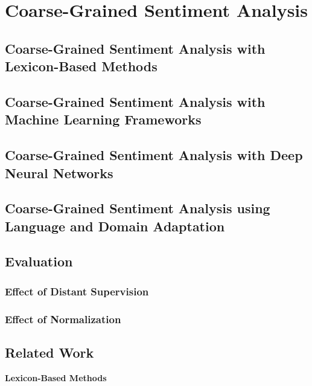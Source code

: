 \chapter{Coarse-Grained Sentiment Analysis}\label{sec:snt:cgsa}

\section{Coarse-Grained Sentiment Analysis with Lexicon-Based Methods}

\section{Coarse-Grained Sentiment Analysis with Machine Learning
  Frameworks}

\section{Coarse-Grained Sentiment Analysis with Deep Neural Networks}

\section{Coarse-Grained Sentiment Analysis using Language and Domain
  Adaptation}

\section{Evaluation}
\subsection{Effect of Distant Supervision}
\subsection{Effect of Normalization}

\section{Related Work}

\textbf{Lexicon-Based Methods}

